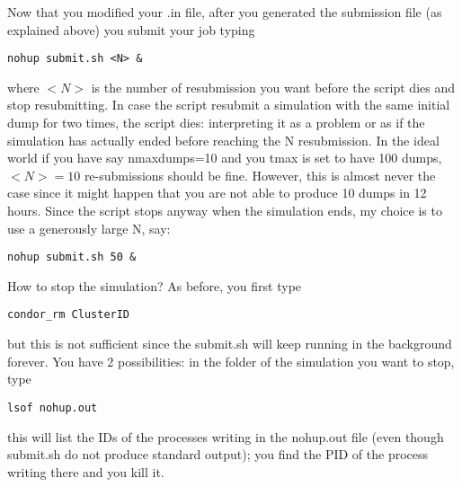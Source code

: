 \documentclass[10pt,a4paper,twoside]{article} %
\begin{document}
Now that you modified your .in file, after you generated the submission file (as explained above) you submit your job typing 
\begin{verbatim}
nohup submit.sh <N> &
\end{verbatim}
where $<N>$ is the number of resubmission you want before the script dies and stop resubmitting. In case the script resubmit a simulation with the same initial dump for two times, the script dies: interpreting it as a problem or as if the simulation has actually ended before reaching the N resubmission. In the ideal world if you have say nmaxdumps=10 and you tmax is set to have 100 dumps, $<N>=10$ re-submissions should be fine. However, this is almost never the case since it might happen that you are not able to produce 10 dumps in 12 hours. Since the script stops anyway when the simulation ends, my choice is to use a generously large N, say:
\begin{verbatim}
nohup submit.sh 50 &
\end{verbatim}

How to stop the simulation? As before, you first type
\begin{verbatim}
condor_rm ClusterID
\end{verbatim}
but this is not sufficient since the submit.sh will keep running in the background forever. You have 2 possibilities: in the folder of the simulation you want to stop, type
\begin{verbatim}
lsof nohup.out
\end{verbatim}
this will list the IDs of the processes writing in the nohup.out file (even though submit.sh do not produce standard output); you find the PID of the process writing there and you kill it.
\end{document}
